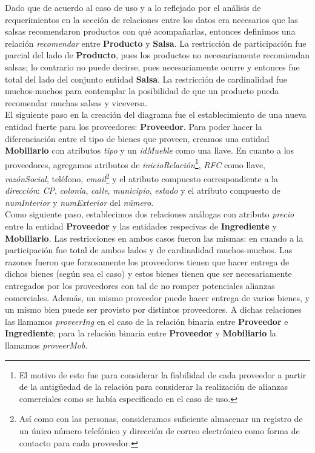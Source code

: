 \documentclass[11pt,letterpaper]{article}
\begin{document}
Dado que de acuerdo al caso de uso y a lo reflejado por el análisis de requerimientos en la sección de relaciones entre los datos era necesarios que las salsas recomendaron productos con qué acompañarlas, entonces definimos una relación \textit{recomendar} entre \textbf{Producto} y \textbf{Salsa}. La restricción de participación fue parcial del lado de \textbf{Producto}, pues los productos no necesariamente recomiendan salsas; lo contrario no puede decirse, pues necesariamente ocurre y entonces fue total del lado del conjunto entidad \textbf{Salsa}. La restricción de cardinalidad fue muchos-muchos para contemplar la posibilidad de que un producto pueda recomendar muchas salsas y viceversa. \\

El siguiente paso en la creación del diagrama fue el establecimiento de una nueva entidad fuerte para los proveedores: \textbf{Proveedor}. Para poder hacer la diferenciación entre el tipo de bienes que proveen, creamos una entidad \textbf{Mobiliario} con atributos \textit{tipo} y un \textit{idMueble} como una llave. En cuanto a los proveedores, agregamos atributos de \textit{inicioRelación}\footnote{El motivo de esto fue para considerar la fiabilidad de cada proveedor a partir de la antigüedad de la relación para considerar la realización de alianzas comerciales como se había especificado en el caso de uso.}, \textit{RFC} como llave, \textit{razónSocial}, teléfono, \textit{email}\footnote{Así como con las personas, consideramos suficiente almacenar un registro de un único número telefónico y dirección de correo electrónico como forma de contacto para cada proveedor.} y el atributo compuesto correspondiente a la \textit{dirección}: \textit{CP}, \textit{colonia}, \textit{calle}, \textit{municipio}, \textit{estado} y el atributo compuesto de \textit{numInterior} y \textit{numExterior} del \textit{número}.\\

Como siguiente paso, establecimos dos relaciones análogas con atributo \textit{precio} entre la entidad \textbf{Proveedor} y las entidades respecivas de \textbf{Ingrediente} y \textbf{Mobiliario}. Las restricciones en ambos casos fueron las mismas: en cuando a la participación fue total de ambos lados y de cardinalidad muchos-muchos. Las razones fueron que forzosamente los proveedores tienen que hacer entrega de dichos bienes (según sea el caso) y estos bienes tienen que ser necesariamente entregados por los proveedores con tal de no romper potenciales alianzas comerciales. Además, un mismo proveedor puede hacer entrega de varios bienes, y un mismo bien puede ser provisto por distintos proveedores. A dichas relaciones las llamamos \textit{proveerIng} en el caso de la relación binaria entre \textbf{Proveedor} e \textbf{Ingrediente}; para la relación binaria entre \textbf{Proveedor} y \textbf{Mobiliario} la llamamos \textit{proveerMob}.\\
\end{document}
